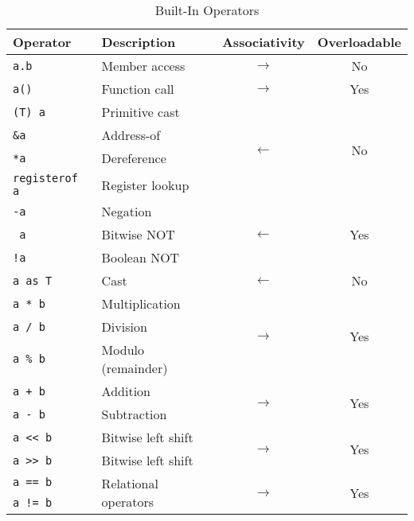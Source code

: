 \documentclass{article}
\begin{document}
    \begin{table}[h]
        \centering
        \caption{Built-In Operators}
        \begin{tabular}{|l|l|c|c|}
            \hline
            \textbf{Operator} & \textbf{Description} & \textbf{Associativity} & \textbf{Overloadable} \\
            \hline
            \texttt{a.b} & Member access & \(\longrightarrow\) & No \\
            \hline
            \texttt{a()} & Function call & \(\longrightarrow\) & Yes \\
            \hline
            \texttt{(T) a} & Primitive cast & \multirow{4}{*}{\(\longleftarrow\)} & \multirow{4}{*}{No} \\
            \texttt{\&a} & Address-of & & \\
            \texttt{*a} & Dereference & & \\
            \texttt{registerof a} & Register lookup & & \\
            \hline
            \texttt{-a} & Negation & \multirow{3}{*}{\(\longleftarrow\)} & \multirow{3}{*}{Yes} \\
            \texttt{~a} & Bitwise NOT & & \\
            \texttt{!a} & Boolean NOT & & \\
            \hline
            \texttt{a as T} & Cast & \(\longleftarrow\) & No \\
            \hline
            \texttt{a * b} & Multiplication & \multirow{3}{*}{\(\longrightarrow\)} & \multirow{3}{*}{Yes} \\
            \texttt{a / b} & Division & & \\
            \texttt{a \% b} & Modulo (remainder) & & \\
            \hline
            \texttt{a + b} & Addition & \multirow{2}{*}{\(\longrightarrow\)} & \multirow{2}{*}{Yes} \\
            \texttt{a - b} & Subtraction & & \\
            \hline
            \texttt{a << b} & Bitwise left shift & \multirow{2}{*}{\(\longrightarrow\)} & \multirow{2}{*}{Yes} \\
            \texttt{a >> b} & Bitwise left shift & & \\
            \hline
            \texttt{a == b} & \multirow{6}{*}{Relational operators} & \multirow{6}{*}{\(\longrightarrow\)} & \multirow{6}{*}{Yes} \\
            \texttt{a != b} & & & \\

\end{tabular}
\end{table}
\end{document}
